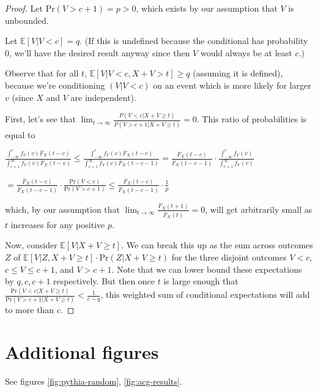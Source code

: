 \documentclass{article}
\theoremstyle{plain}
\theoremstyle{definition}
\theoremstyle{remark}
\begin{document}
\begin{proof}
Let \(\text{Pr}(V>c+1)=p>0\), which exists by our assumption that \(V\) is unbounded.

Let \(\mathbb E[V|V<c] = q\). (If this is undefined because the conditional has probability \(0\), we'll have the desired result anyway since then \(V\) would always be at least \(c\).) 

Observe that for all \(t\), \(\mathbb E[V|V<c, X+V>t] \ge q\) (assuming it is defined), because we're conditioning \((V|V<c)\) on an event which is more likely for larger \(v\) (since \(X\) and \(V\) are independent). 

First, let's see that \(\lim_{t\to\infty}\frac{P(V<c|X+V\ge t)}{P(V>c+1|X+V\ge t)}=0\). This ratio of probabilities is equal to

\(\frac{\int_{-\infty}^c f_V(v)\bar F_X(t-v)}{\int_{c+1}^\infty f_V(v)\bar F_X(t-v)} \le \frac{\int_{-\infty}^c f_V(v)\bar F_X(t-c)}{\int_{c+1}^\infty f_V(v)\bar F_X(t-c-1)} = \frac{\bar F_X(t-c)}{\bar F_X(t-c-1)}\cdot \frac{\int_{-\infty}^c f_V(v)}{\int_{c+1}^\infty f_V(v)}\)

\(=\frac{\bar F_X(t-c)}{\bar F_X(t-c-1)}\cdot \frac{\text{Pr}(V<c)}{\text{Pr}(V>c+1)}\le \frac{\bar F_X(t-c)}{\bar F_X(t-c-1)}\cdot \frac1p\)

which, by our assumption that \(\lim_{t\to\infty}\frac{\bar{F}_X(t+1)}{\bar{F}_X(t)}=0\), will get arbitrarily small as \(t\) increases for any positive \(p\).

Now, consider \(\mathbb E[V|X+V\ge t]\). We can break this up as the sum across outcomes \(Z\) of \(\mathbb E[V|Z,X+V\ge t]\cdot \text{Pr}(Z | X+V\ge t)\) for the three disjoint outcomes \(V<c\), \(c\le V\le c+1\), and \(V>c+1\). Note that we can lower bound these expectations by \(q, c, c+1\) respectively. But then once \(t\) is large enough that \(\frac{\text{Pr}(V<c|X+V\ge t)}{\text{Pr}(V>c+1|X+V\ge t)}<\frac1{c-q}\),  this weighted sum of conditional expectations will add to more than \(c\).
\end{proof}

\section{Additional figures}

See figures \ref{fig:pythia-random}, \ref{fig:acg-results}.
\end{document}
